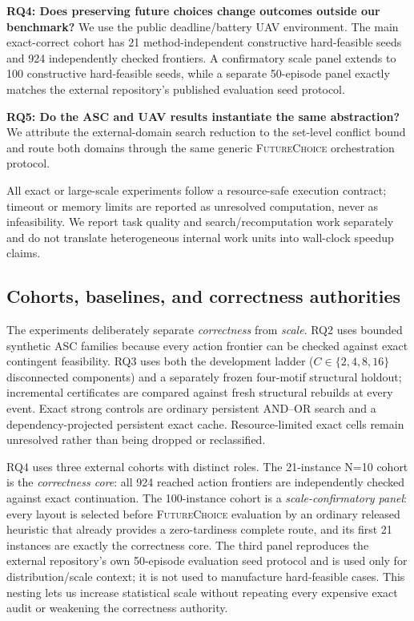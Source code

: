 \documentclass[conference]{IEEEtran}
\newcommand{\futurechoice}{\textsc{FutureChoice}\xspace}
\begin{document}
\textbf{RQ4: Does preserving future choices change outcomes outside our benchmark?} We use the public deadline/battery UAV environment. The main exact-correct cohort has 21 method-independent constructive hard-feasible seeds and 924 independently checked frontiers. A confirmatory scale panel extends to 100 constructive hard-feasible seeds, while a separate 50-episode panel exactly matches the external repository's published evaluation seed protocol.

\textbf{RQ5: Do the ASC and UAV results instantiate the same abstraction?} We attribute the external-domain search reduction to the set-level conflict bound and route both domains through the same generic \futurechoice orchestration protocol.

All exact or large-scale experiments follow a resource-safe execution contract; timeout or memory limits are reported as unresolved computation, never as infeasibility. We report task quality and search/recomputation work separately and do not translate heterogeneous internal work units into wall-clock speedup claims.

\subsection{Cohorts, baselines, and correctness authorities}
The experiments deliberately separate \emph{correctness} from \emph{scale}. RQ2 uses bounded synthetic ASC families because every action frontier can be checked against exact contingent feasibility. RQ3 uses both the development ladder ($C\in\{2,4,8,16\}$ disconnected components) and a separately frozen four-motif structural holdout; incremental certificates are compared against fresh structural rebuilds at every event. Exact strong controls are ordinary persistent AND--OR search and a dependency-projected persistent exact cache. Resource-limited exact cells remain unresolved rather than being dropped or reclassified.

RQ4 uses three external cohorts with distinct roles. The 21-instance N=10 cohort is the \emph{correctness core}: all 924 reached action frontiers are independently checked against exact continuation. The 100-instance cohort is a \emph{scale-confirmatory panel}: every layout is selected before \futurechoice evaluation by an ordinary released heuristic that already provides a zero-tardiness complete route, and its first 21 instances are exactly the correctness core. The third panel reproduces the external repository's own 50-episode evaluation seed protocol and is used only for distribution/scale context; it is not used to manufacture hard-feasible cases. This nesting lets us increase statistical scale without repeating every expensive exact audit or weakening the correctness authority.
\end{document}
